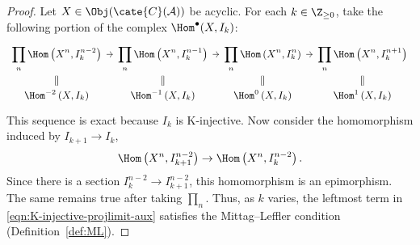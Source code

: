\begin{proof}
	Let $X\in\Obj(\cate{C}(\mathcal{A}))$ be acyclic. For each
	$k\in\Z_{\geq0}$, take the following portion of the complex
	$\Hom^\bullet(X,I_k)$:
	\begin{equation}\label{eqn:K-injective-projlimit-aux}\begin{tikzcd}
		[row sep=small, column sep=tiny,
		every cell/.append style = {font = \small}]
		\displaystyle\prod_n \Hom\left( X^n, I_k^{n-2} \right) \arrow[r] &
		\displaystyle\prod_n \Hom\left( X^n, I_k^{n-1} \right) \arrow[r] &
		\displaystyle\prod_n \Hom\left( X^n, I_k^n \right) \arrow[r] &
		\displaystyle\prod_n \Hom\left( X^n, I_k^{n+1} \right) \\
		\Hom^{-2}\left( X, I_k \right) \arrow[equal, u] &
		\Hom^{-1}\left( X, I_k \right) \arrow[equal, u] &
		\Hom^0\left( X, I_k \right) \arrow[equal, u] &
		\Hom^1\left( X, I_k \right) \arrow[equal, u]
	\end{tikzcd}\end{equation}
	This sequence is exact because $I_k$ is K-injective. Now consider the
	homomorphism induced by $I_{k+1}\to I_k$,
	\[
	\Hom\left(X^n,I_{k+1}^{n-2}\right)\to
	\Hom\left(X^n,I_k^{n-2}\right).
	\]
	Since there is a section $I_k^{n-2}\to I_{k+1}^{n-2}$, this
	homomorphism is an epimorphism. The same remains true after taking
	$\prod_n$. Thus, as $k$ varies, the leftmost term in
	\eqref{eqn:K-injective-projlimit-aux} satisfies the Mittag--Leffler
	condition (Definition~\ref{def:ML}).


\end{proof}
